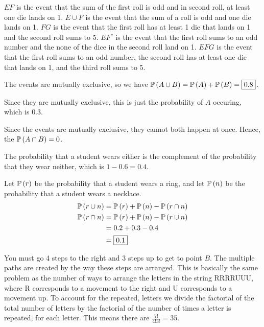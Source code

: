 \documentclass{article}
\begin{document}
\setcounter{problem}{2} 
\problem{}

$EF$ is the event that the sum of the first roll is odd and in second roll, at least one die lands on 1.
$E \cup F$ is the event that the sum of a roll is odd and one die lands on 1.
$FG$ is the event that the first roll has at least 1 die that lands on 1 and the second roll sums to 5.
$EF^c$ is the event that the first roll sums to an odd number and the none of the dice in the second roll land on 1.
$EFG$ is the event that the first roll sums to an odd number, the second roll has at least one die that lands on 1, and the third roll sums to 5.

\setcounter{problem}{8}

\subproblema{}
The events are mutually exclusive, so we have $\mathbb{P} \left ( A \cup B \right) = \mathbb{P} \left ( A \right) + \mathbb{P} \left ( B \right) = \boxed{0.8}$.

\subproblema{}
Since they are mutually exclusive, this is just the probability of $A$ occuring, which is $\boxed{0.3}$.

\subproblema{}
Since the events are mutually exclusive, they cannot both happen at once.
Hence, the $\mathbb{P} \left ( A \cap B \right) = 0$.


\setcounter{problem}{10}
\subproblema{}
The probability that a student wears either is the complement of the probability that they wear neither, which is $1 - 0.6 = \boxed{0.4}$.


\subproblema{}

Let $\mathbb{P} \left ( r \right)$ be the probability that a student wears a ring, and let $\mathbb{P} \left ( n \right)$ be the probability that a student wears a necklace.
\begin{align*}
  \mathbb{P} \left ( r \cup n \right) &= \mathbb{P} \left ( r \right) + \mathbb{P} \left ( n \right) - \mathbb{P} \left ( r \cap n \right) \\
  \mathbb{P} \left ( r \cap n \right) &= \mathbb{P} \left ( r \right) + \mathbb{P} \left ( n \right) - \mathbb{P} \left ( r \cup n \right) \\
                      &= 0.2 + 0.3 - 0.4 \\
                      &= \boxed{0.1} \\
\end{align*}

\setcounter{problem}{22}
\problem{}

You must go 4 steps to the right and 3 steps up to get to point $B$.
The multiple paths are created by the way these steps are arranged.
This is basically the same problem as the number of ways to arrange the letters in the string RRRRUUU, where R corresponds to a movement to the right and U corresponds to a movement up.
To account for the repeated, letters we divide the factorial of the total number of letters by the factorial of the number of times a letter is repeated, for each letter.
This means there are $\frac{7!}{4! 3!} = \boxed{35}$.
\end{document}
